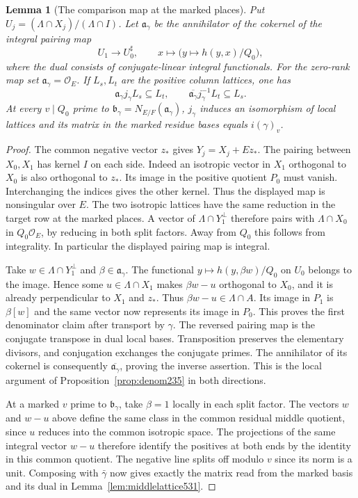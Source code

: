 \documentclass[a4paper,11pt]{article}
\newtheorem{lemma}[proposition]{Lemma}
\theoremstyle{definition}
\theoremstyle{remark}
\numberwithin{equation}{section}
\begin{document}
\begin{lemma}[The comparison map at the marked places]
\leavevmode\label{lem:markedtransport533}
Put \(U_j=(\Lambda\cap X_j)/(\Lambda\cap I)\). Let
\(\mathfrak a_\gamma\) be the annihilator of the cokernel of
the integral pairing map
\[
       U_1\longrightarrow U_0^\sharp,\qquad
            x\longmapsto\bigl(y\longmapsto h(y,x)/Q_0\bigr),
\]
where the dual consists of conjugate-linear integral functionals.
For the zero-rank map set \(\mathfrak a_\gamma=\mathcal O_E\).
If \(L_s,L_t\) are the positive column lattices, one has
\[
  \mathfrak a_\gamma j_\gamma L_s\subseteq L_t,\qquad
  \overline{\mathfrak a_\gamma}j_\gamma^{-1}L_t\subseteq L_s .
\]
At every \(v\mid Q_0\) prime to
\(\mathfrak b_\gamma=N_{E/F}(\mathfrak a_\gamma)\),
\(j_\gamma\) induces an isomorphism of local lattices and its
matrix in the marked residue bases equals \(i(\gamma)_v\).
\end{lemma}
\begin{proof}
The common negative vector \(z_*\) gives \(Y_j=X_j+Ez_*\).
The pairing between \(X_0,X_1\) has kernel \(I\) on each side.
Indeed an isotropic vector in \(X_1\) orthogonal to \(X_0\)
is also orthogonal to \(z_*\). Its image in the positive
quotient \(P_0\) must vanish. Interchanging the indices gives
the other kernel. Thus the displayed map is nonsingular over
\(E\). The two isotropic lattices have the same reduction in
the target row at the marked places. A vector of \(\Lambda\cap
Y_1^\perp\) therefore pairs with \(\Lambda\cap X_0\) in
\(Q_0\mathcal O_E\), by reducing in both split factors.
Away from \(Q_0\) this follows from integrality. In particular
the displayed pairing map is integral.

Take \(w\in\Lambda\cap Y_1^\perp\) and
\(\beta\in\mathfrak a_\gamma\). The functional
\(y\mapsto h(y,\beta w)/Q_0\) on \(U_0\) belongs to the image.
Hence some \(u\in\Lambda\cap X_1\) makes \(\beta w-u\)
orthogonal to \(X_0\), and it is already perpendicular to
\(X_1\) and \(z_*\). Thus \(\beta w-u\in\Lambda\cap A\).
Its image in \(P_1\) is \(\beta[w]\) and the same vector now
represents its image in \(P_0\). This proves the first
denominator claim after transport by \(\gamma\). The reversed
pairing map is the conjugate transpose in dual local bases.
Transposition preserves the elementary divisors, and conjugation
exchanges the conjugate primes. The annihilator of its cokernel
is consequently \(\overline{\mathfrak a_\gamma}\), proving the
inverse assertion. This is the local argument of
Proposition~\ref{prop:denom235} in both directions.

At a marked \(v\) prime to \(\mathfrak b_\gamma\), take
\(\beta=1\) locally in each split factor. The vectors \(w\)
and \(w-u\) above define the same class in the common residual
middle quotient, since \(u\) reduces into the common isotropic
space. The projections of the same integral vector \(w-u\)
therefore identify the positives at both ends by the identity
in this common quotient. The negative line splits off modulo
\(v\) since its norm is a unit. Composing with \(\bar\gamma\)
now gives exactly the matrix read from the marked basis and
its dual in Lemma~\ref{lem:middlelattice531}.
\end{proof}
\end{document}
